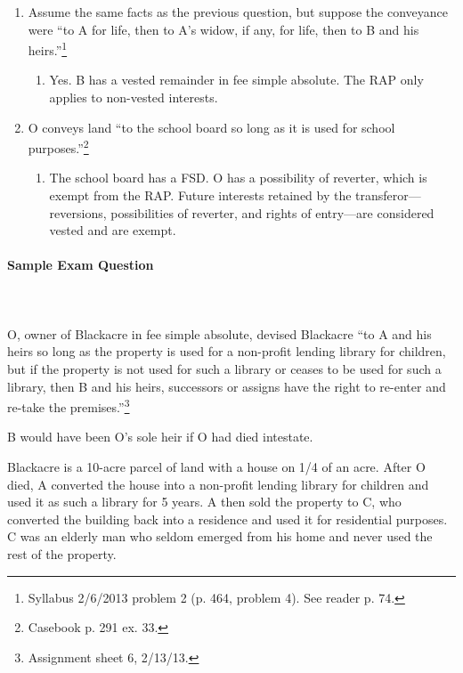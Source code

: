 \begin{enumerate}
    \item Assume the same facts as the previous question, but suppose the 
    conveyance were ``to A for life, then to A's widow, if any, for life, then 
    to B and his heirs.''\footnote{Syllabus 2/6/2013 problem 2 (p. 464, 
    problem 4). See reader p. 74.}
    \begin{enumerate}
        \item Yes. B has a vested remainder in fee simple absolute. The RAP 
        only applies to non-vested interests.
    \end{enumerate}
    \item O conveys land ``to the school board so long as it is used for 
    school purposes.''\footnote{Casebook p. 291 ex. 33.}
    \begin{enumerate}
        \item The school board has a FSD. O has a possibility of reverter, 
        which is exempt from the RAP. Future interests retained by the 
        transferor---reversions, possibilities of reverter, and rights of 
        entry---are considered vested and are exempt.
    \end{enumerate}
\end{enumerate}

\paragraph{Sample Exam Question}
~\\\\
O, owner of Blackacre in fee simple absolute, devised Blackacre ``to A and his 
heirs so long as the property is used for a non-profit lending library for 
children, but if the property is not used for such a library or ceases to be 
used for such a library, then B and his heirs, successors or assigns have the 
right to re-enter and re-take the premises.''\footnote{Assignment sheet 6, 
2/13/13.}

B would have been O's sole heir if O had died intestate.

Blackacre is a 10-acre parcel of land with a house on 1/4 of an acre. After O 
died, A converted the house into a non-profit lending library for children and 
used it as such a library for 5 years. A then sold the property to C, who 
converted the building back into a residence and used it for residential 
purposes. C was an elderly man who seldom emerged from his home and never used 
the rest of the property.

